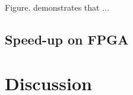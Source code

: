 \documentclass{article}
\begin{document}
Figure. demonstrates that ...






\subsection{Speed-up on FPGA}















\newpage
\section{Discussion}








\cite{iht}
\cite{niht}
\cite{greedy_algorithms}
\nocite{langley00}



\end{document}
